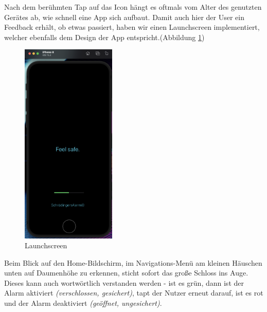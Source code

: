 Nach dem berühmten Tap auf das Icon hängt es oftmals vom Alter des genutzten Gerätes ab, wie schnell eine App sich aufbaut. Damit auch hier der User ein Feedback erhält, ob  etwas passiert, haben wir einen Launchscreen implementiert, welcher ebenfalls dem Design der App entspricht.(Abbildung \ref{Launch})
\begin{figure} [H]
	\begin{center}
		\includegraphics[width=0.4\textwidth]{Bilder/iOS_launch.png}
		\caption{Launchscreen}
		\label{Launch}
	\end{center}
\end{figure}
Beim Blick auf den Home-Bildschirm, im Navigations-Menü am kleinen Häuschen unten auf Daumenhöhe zu erkennen, sticht sofort das große Schloss ins Auge. Dieses kann auch wortwörtlich verstanden werden - ist es grün, dann ist der Alarm aktiviert \textit{(verschlossen, gesichert)}, tapt der Nutzer erneut darauf, ist es rot und der Alarm deaktiviert \textit{(geöffnet, ungesichert)}.

